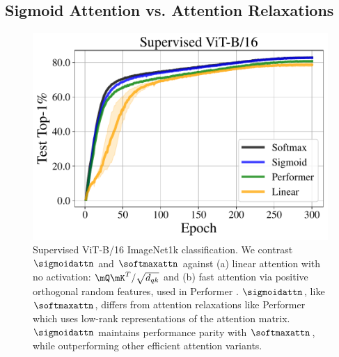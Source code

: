 \subsection{Sigmoid Attention vs. Attention Relaxations}
\label{sec:attention_relaxations}
\vspace{-0.1in}
\begin{figure}[ht]
   \begin{minipage}{0.5\textwidth}
    \centering
    \includegraphics[width=\linewidth]{figures/test_top1_attn_relaxations.pdf}
  \end{minipage}%
  \hfill
  \begin{minipage}{0.48\textwidth}
    \caption{Supervised ViT-B/16 ImageNet1k classification. We contrast $\sigmoidattn$ and $\softmaxattn$ against (a) linear attention with no activation: $\mQ \mK^T / \sqrt{d_{qk}}$ and (b) fast attention via positive orthogonal random features, used in Performer \citep{DBLP:conf/iclr/ChoromanskiLDSG21}. $\sigmoidattn$, like $\softmaxattn$, differs from attention relaxations like Performer which uses low-rank representations of the attention matrix. $\sigmoidattn$ maintains performance parity with $\softmaxattn$, while outperforming other efficient attention variants.}
    \label{fig:attention_relaxations}
  \end{minipage}  
\end{figure}
\vspace{-0.1in}
